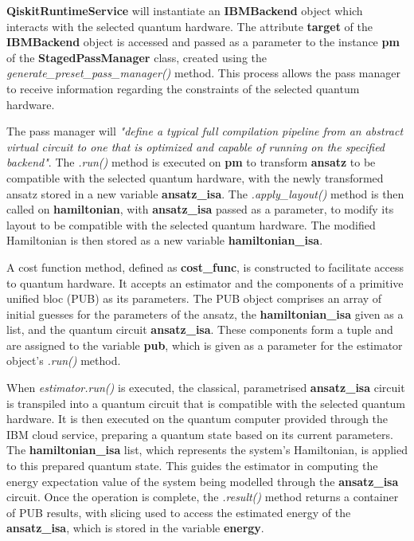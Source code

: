 \documentclass{article}
\begin{document}
{\textbf{QiskitRuntimeService} will instantiate an \textbf{IBMBackend} object which interacts with the selected quantum hardware. The attribute \textbf{target} of the \textbf{IBMBackend} object is accessed and passed as a parameter to the instance \textbf{pm} of the \textbf{StagedPassManager} class, created using the \textit{generate\_preset\_pass\_manager()} method. This process allows the pass manager to receive information regarding the constraints of the selected quantum hardware.

The pass manager will \textit{"define a typical full compilation pipeline from an abstract virtual circuit to one that is optimized and capable of running on the specified backend"}\cite{StagedPassManager}. The \textit{.run()} method is executed on \textbf{pm} to transform \textbf{ansatz} to be compatible with the selected quantum hardware, with the newly transformed ansatz stored in a new variable \textbf{ansatz\_isa}. The \textit{.apply\_layout()} method is then called on \textbf{hamiltonian}, with \textbf{ansatz\_isa} passed as a parameter, to modify its layout to be compatible with the selected quantum hardware. The modified Hamiltonian is then stored as a new variable  \textbf{hamiltonian\_isa}.

A cost function method, defined as \textbf{cost\_func}, is constructed to facilitate access to quantum hardware. It accepts an estimator and the components of a primitive unified bloc (PUB) as its parameters. The PUB object comprises an array of initial guesses for the parameters of the ansatz, the \textbf{hamiltonian\_isa} given as a list, and the quantum circuit \textbf{ansatz\_isa}. These components form a tuple and are assigned to the variable \textbf{pub}, which is given as a parameter for the estimator object's \textit{.run()} method. 

When \textit{estimator.run()} is executed, the classical, parametrised \textbf{ansatz\_isa} circuit is transpiled into a quantum circuit that is compatible with the selected quantum hardware. It is then executed on the quantum computer provided through the IBM cloud service, preparing a quantum state based on its current parameters. The \textbf{hamiltonian\_isa} list, which represents the system's Hamiltonian, is applied to this prepared quantum state. This guides the estimator in computing the energy expectation value of the system being modelled through the \textbf{ansatz\_isa} circuit. Once the operation is complete, the \textit{.result()} method returns a container of PUB results\cite{PrimitiveResult}, with slicing used to access the estimated energy of the \textbf{ansatz\_isa}, which is stored in the variable \textbf{energy}.

}
\end{document}
